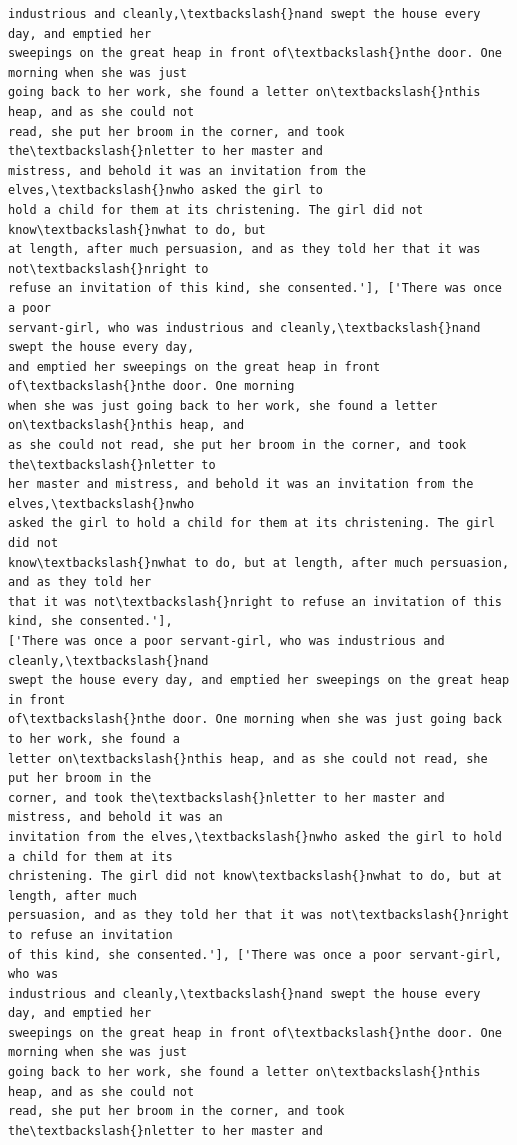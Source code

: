 \documentclass[11pt]{article}
\begin{document}
\begin{Verbatim}[commandchars=\\\{\}]
industrious and cleanly,\textbackslash{}nand swept the house every day, and emptied her
sweepings on the great heap in front of\textbackslash{}nthe door. One morning when she was just
going back to her work, she found a letter on\textbackslash{}nthis heap, and as she could not
read, she put her broom in the corner, and took the\textbackslash{}nletter to her master and
mistress, and behold it was an invitation from the elves,\textbackslash{}nwho asked the girl to
hold a child for them at its christening. The girl did not know\textbackslash{}nwhat to do, but
at length, after much persuasion, and as they told her that it was not\textbackslash{}nright to
refuse an invitation of this kind, she consented.'], ['There was once a poor
servant-girl, who was industrious and cleanly,\textbackslash{}nand swept the house every day,
and emptied her sweepings on the great heap in front of\textbackslash{}nthe door. One morning
when she was just going back to her work, she found a letter on\textbackslash{}nthis heap, and
as she could not read, she put her broom in the corner, and took the\textbackslash{}nletter to
her master and mistress, and behold it was an invitation from the elves,\textbackslash{}nwho
asked the girl to hold a child for them at its christening. The girl did not
know\textbackslash{}nwhat to do, but at length, after much persuasion, and as they told her
that it was not\textbackslash{}nright to refuse an invitation of this kind, she consented.'],
['There was once a poor servant-girl, who was industrious and cleanly,\textbackslash{}nand
swept the house every day, and emptied her sweepings on the great heap in front
of\textbackslash{}nthe door. One morning when she was just going back to her work, she found a
letter on\textbackslash{}nthis heap, and as she could not read, she put her broom in the
corner, and took the\textbackslash{}nletter to her master and mistress, and behold it was an
invitation from the elves,\textbackslash{}nwho asked the girl to hold a child for them at its
christening. The girl did not know\textbackslash{}nwhat to do, but at length, after much
persuasion, and as they told her that it was not\textbackslash{}nright to refuse an invitation
of this kind, she consented.'], ['There was once a poor servant-girl, who was
industrious and cleanly,\textbackslash{}nand swept the house every day, and emptied her
sweepings on the great heap in front of\textbackslash{}nthe door. One morning when she was just
going back to her work, she found a letter on\textbackslash{}nthis heap, and as she could not
read, she put her broom in the corner, and took the\textbackslash{}nletter to her master and

\end{Verbatim}
\end{document}
